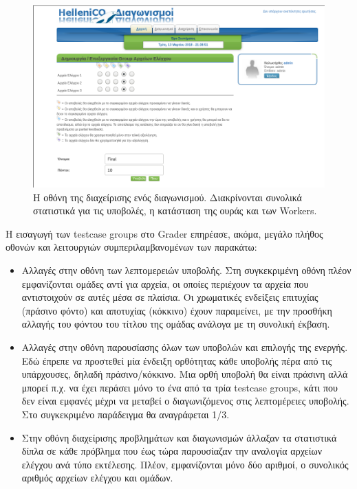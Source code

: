 \documentclass[diploma]{softlab-thesis}
\begin{document}
\begin{figure}
  \centering
  \includegraphics[scale=0.3]{Figures/groupedit.png}
  \caption[Οθόνη διαχείρισης προβλήματος]{Η οθόνη της διαχείρισης ενός διαγωνισμού.
  Διακρίνονται συνολικά στατιστικά για τις υποβολές, η κατάσταση της ουράς και των
  Workers.}
\end{figure}

\bigskip

Η εισαγωγή των testcase groups στο Grader επηρέασε, ακόμα, μεγάλο πλήθος οθονών
και λειτουργιών συμπεριλαμβανομένων των παρακάτω:

\begin{itemize}
    \item Αλλαγές στην οθόνη των λεπτομερειών υποβολής. Στη συγκεκριμένη
      οθόνη πλέον εμφανίζονται ομάδες αντί για αρχεία, οι οποίες περιέχουν
      τα αρχεία που αντιστοιχούν σε αυτές μέσα σε πλαίσια. Οι χρωματικές ενδείξεις
      επιτυχίας (πράσινο φόντο) και αποτυχίας (κόκκινο) έχουν παραμείνει, με την
      προσθήκη αλλαγής του φόντου του τίτλου της ομάδας ανάλογα με τη συνολική
      έκβαση.

    \item Αλλαγές στην οθόνη παρουσίασης όλων των υποβολών και επιλογής της ενεργής.
      Εδώ έπρεπε να προστεθεί μία ένδειξη ορθότητας κάθε υποβολής πέρα από τις
      υπάρχουσες, δηλαδή πράσινο/κόκκινο. Μια ορθή υποβολή θα είναι πράσινη αλλά
      μπορεί π.χ. να έχει περάσει μόνο το ένα από τα τρία testcase groups, κάτι
      που δεν είναι εμφανές μέχρι να μεταβεί ο διαγωνιζόμενος στις λεπτομέρειες
      υποβολής. Στο συγκεκριμένο παράδειγμα θα αναγράφεται 1/3.

    \item Στην οθόνη διαχείρισης προβλημάτων και διαγωνισμών άλλαξαν τα στατιστικά
      δίπλα σε κάθε πρόβλημα που έως τώρα παρουσίαζαν την αναλογία αρχείων ελέγχου
      ανά τύπο εκτέλεσης. Πλέον, εμφανίζονται μόνο δύο αριθμοί, ο συνολικός αριθμός
      αρχείων ελέγχου και ομάδων.

\end{itemize}
\end{document}
